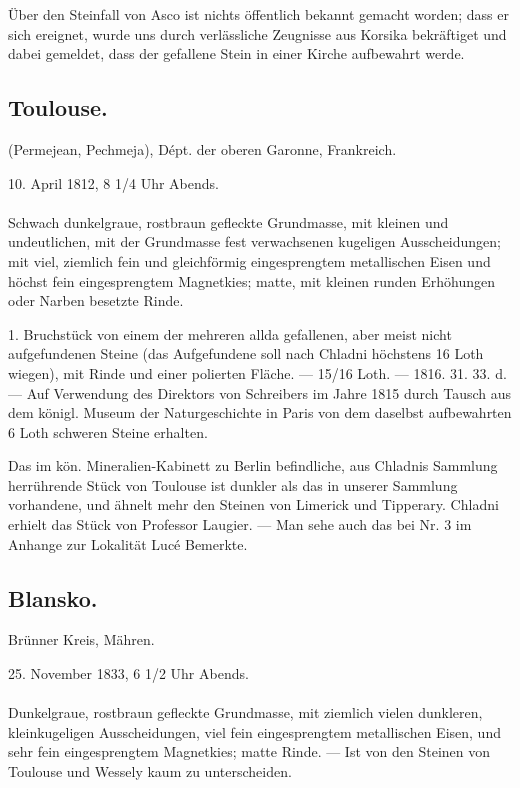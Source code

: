 \documentclass[a4paper, 11pt, oneside, polutonikogreek, german]{article}
\begin{document}
Über den Steinfall von Asco ist nichts öffentlich bekannt gemacht worden; dass er sich ereignet, wurde uns durch verlässliche Zeugnisse aus Korsika bekräftiget und dabei gemeldet, dass der gefallene Stein in einer Kirche aufbewahrt werde.
\subsection{Toulouse.}
\begin{center}
\small
(Permejean, Pechmeja), Dépt. der oberen Garonne, Frankreich.

10. April 1812, 8 1/4 Uhr Abends.
\end{center}
\paragraph{}
Schwach dunkelgraue, rostbraun gefleckte Grundmasse, mit kleinen und undeutlichen, mit der Grundmasse fest verwachsenen kugeligen Ausscheidungen; mit viel, ziemlich fein und gleichförmig eingesprengtem metallischen Eisen und höchst fein eingesprengtem Magnetkies; matte, mit kleinen runden Erhöhungen oder Narben besetzte Rinde.

1. Bruchstück von einem der mehreren allda gefallenen, aber meist nicht aufgefundenen Steine (das Aufgefundene soll nach Chladni höchstens 16 Loth wiegen), mit Rinde und einer polierten Fläche. — 15/16 Loth. — 1816. 31. 33. d. — Auf Verwendung des Direktors von Schreibers im Jahre 1815 durch Tausch aus dem königl. Museum der Naturgeschichte in Paris von dem daselbst aufbewahrten 6 Loth schweren Steine erhalten.

Das im kön. Mineralien-Kabinett zu Berlin befindliche, aus Chladnis Sammlung herrührende Stück von Toulouse ist dunkler als das in unserer Sammlung vorhandene, und ähnelt mehr den Steinen von Limerick und Tipperary. Chladni erhielt das Stück von Professor Laugier. — Man sehe auch das bei Nr. 3 im Anhange zur Lokalität Lucé Bemerkte.
\subsection{Blansko.}
\begin{center}
\small
Brünner Kreis, Mähren.

25. November 1833, 6 1/2 Uhr Abends.
\end{center}
\paragraph{}
Dunkelgraue, rostbraun gefleckte Grundmasse, mit ziemlich vielen dunkleren, kleinkugeligen Ausscheidungen, viel fein eingesprengtem metallischen Eisen, und sehr fein eingesprengtem Magnetkies; matte Rinde. — Ist von den Steinen von Toulouse und Wessely kaum zu unterscheiden.
\end{document}
